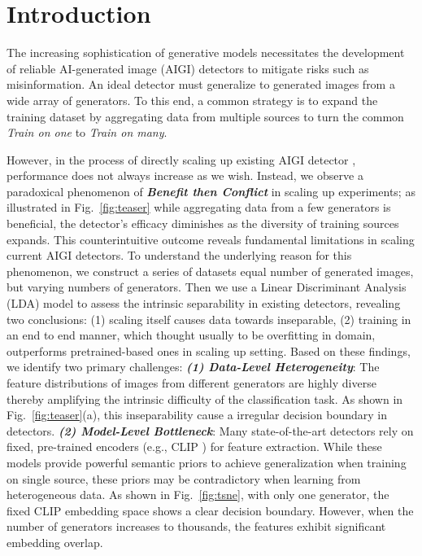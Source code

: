 
\section{Introduction}
\label{sec:intro}

The increasing sophistication of generative models \cite{rombach2022high, AdobeFirefly, wu2025qwenimage} necessitates the development of reliable AI-generated image (AIGI) detectors to mitigate risks such as misinformation. An ideal detector must generalize to generated images from a wide array of generators. To this end, a common strategy is to expand the training dataset by aggregating data from multiple sources \cite{yang2025d3, park2025commfor} to turn the common \textit{Train on one} to \textit{Train on many}.

However, in the process of directly scaling up existing AIGI detector \cite{ojha2023towards,yang2025d3}, performance does not always increase as we wish. Instead, we observe a paradoxical phenomenon of \textit{\textbf{Benefit then Conflict}} in scaling up experiments; as illustrated in Fig.~\ref{fig:teaser} while aggregating data from a few generators is beneficial, the detector's efficacy diminishes as the diversity of training sources expands.  This counterintuitive outcome reveals fundamental limitations in scaling current AIGI detectors. To understand the underlying reason for this phenomenon, we construct a series of datasets equal number of generated images, but varying numbers of generators. Then we use a Linear Discriminant Analysis (LDA) model to assess the intrinsic separability in existing detectors, revealing two conclusions: (1) scaling itself causes data towards inseparable, (2) training in an end to end manner, which thought usually to be overfitting in domain, outperforms pretrained-based ones in scaling up setting. Based on these findings, we identify two primary challenges: \textit{\textbf{(1) Data-Level Heterogeneity}}: The feature distributions of images from different generators are highly diverse thereby amplifying the intrinsic difficulty of the classification task. As shown in Fig.~\ref{fig:teaser}(a), this inseparability cause a irregular decision boundary in detectors.  \textit{\textbf{(2) Model-Level Bottleneck}}: Many state-of-the-art detectors \cite{ojha2023towards, liu2024forgery, tan2025c2p, yan2024sanity, wen2025spot} rely on fixed, pre-trained encoders (e.g., CLIP \cite{CLIP})  for feature extraction. While these models provide powerful semantic priors to achieve generalization when training on single source, these priors may be contradictory when learning from heterogeneous data. As shown in Fig.~\ref{fig:tsne}, with only one generator, the fixed CLIP embedding space shows a clear decision boundary. However, when the number of generators increases to thousands, the features exhibit significant embedding overlap.

